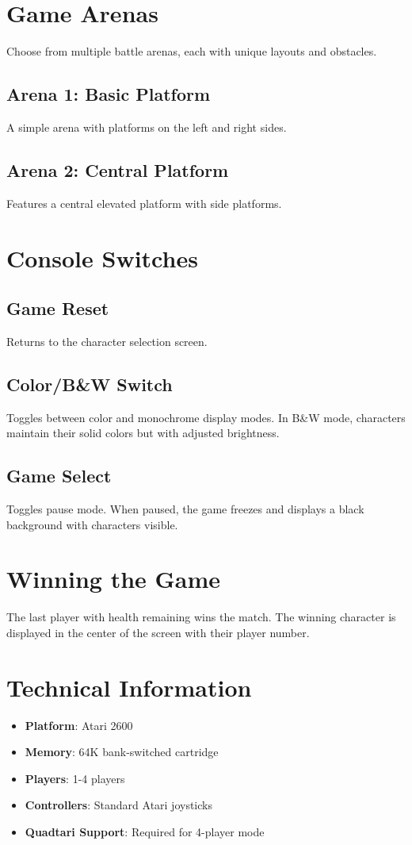 \documentclass[10pt,twocolumn]{article}
\begin{document}
\section{Game Arenas}
Choose from multiple battle arenas, each with unique layouts and obstacles.

\subsection{Arena 1: Basic Platform}
A simple arena with platforms on the left and right sides.

\subsection{Arena 2: Central Platform}
Features a central elevated platform with side platforms.

\section{Console Switches}

\subsection{Game Reset}
Returns to the character selection screen.

\subsection{Color/B\&W Switch}
Toggles between color and monochrome display modes. In B\&W mode, characters maintain their solid colors but with adjusted brightness.

\subsection{Game Select}
Toggles pause mode. When paused, the game freezes and displays a black background with characters visible.

\section{Winning the Game}
The last player with health remaining wins the match. The winning character is displayed in the center of the screen with their player number.

\section{Technical Information}
\begin{itemize}
\item \textbf{Platform}: Atari 2600
\item \textbf{Memory}: 64K bank-switched cartridge
\item \textbf{Players}: 1-4 players
\item \textbf{Controllers}: Standard Atari joysticks
\item \textbf{Quadtari Support}: Required for 4-player mode
\end{itemize}
\end{document}
